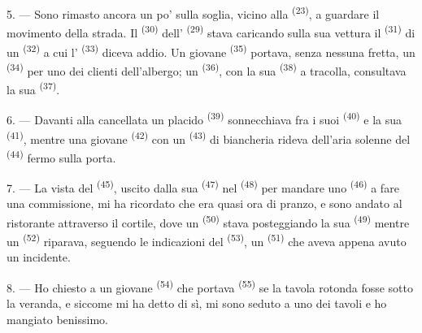 5. --- Sono rimasto ancora un po' sulla soglia, vicino alla  \textsuperscript{(23)}, a guardare il movimento della strada. Il
 \textsuperscript{(30)} dell' \textsuperscript{(29)}
stava caricando sulla sua vettura il  \textsuperscript{(31)} di un
 \textsuperscript{(32)} a cui l'
\textsuperscript{(33)} diceva addio. Un giovane 
\textsuperscript{(35)} portava, senza nessuna fretta, un 
\textsuperscript{(34)} per uno dei clienti dell'albergo; un 
\textsuperscript{(36)}, con la sua 
\textsuperscript{(38)} a tracolla, consultava la sua 
\textsuperscript{(37)}.

\VUsaut{4.0mm}
\VUsaut{3.0mm}

6. --- Davanti alla cancellata un placido 
\textsuperscript{(39)} sonnecchiava fra i suoi 
\textsuperscript{(40)} e la sua 
\textsuperscript{(41)}, mentre una giovane  \textsuperscript{(42)}
con un  \textsuperscript{(43)} di biancheria rideva dell'aria solenne del
 \textsuperscript{(44)} fermo sulla porta.

7. --- La vista del  \textsuperscript{(45)}, uscito dalla sua
 \textsuperscript{(47)} nel 
\textsuperscript{(48)} per mandare uno  \textsuperscript{(46)} a fare
una commissione, mi ha ricordato che era quasi ora di pranzo, e sono andato al
ristorante attraverso il cortile, dove un  \textsuperscript{(50)}
stava posteggiando la sua  \textsuperscript{(49)} mentre un
 \textsuperscript{(52)} riparava, seguendo le indicazioni del
 \textsuperscript{(53)}, un 
\textsuperscript{(51)} che aveva appena avuto un incidente.

8. --- Ho chiesto a un giovane  \textsuperscript{(54)} che portava
 \textsuperscript{(55)} se la tavola rotonda fosse sotto la
veranda, e siccome mi ha detto di sì, mi sono seduto a uno dei tavoli e ho mangiato
benissimo.


